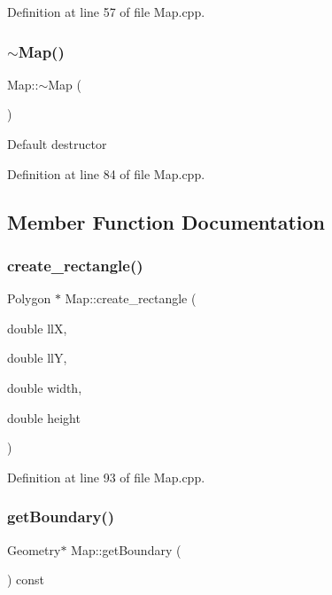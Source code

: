 Definition at line 57 of file Map.\+cpp.

\mbox{\label{class_map_aa403fbe09394ccf39747588f5168e3b2}} 
\subsubsection{$\sim$Map()}
{\footnotesize\ttfamily Map\+::$\sim$\+Map (\begin{DoxyParamCaption}{ }\end{DoxyParamCaption})\hspace{0.3cm}{\ttfamily [virtual]}}

Default destructor 

Definition at line 84 of file Map.\+cpp.



\subsection{Member Function Documentation}
\mbox{\label{class_map_a222f5585368eeb768b63b612207b6965}} 
\subsubsection{create\_rectangle()}
{\footnotesize\ttfamily Polygon $\ast$ Map\+::create\+\_\+rectangle (\begin{DoxyParamCaption}\item[{double}]{llX,  }\item[{double}]{llY,  }\item[{double}]{width,  }\item[{double}]{height }\end{DoxyParamCaption})\hspace{0.3cm}{\ttfamily [private]}}



Definition at line 93 of file Map.\+cpp.

\mbox{\label{class_map_a74dd5445ed90bea2a9cc3240bc23f1bc}} 
\subsubsection{getBoundary()}
{\footnotesize\ttfamily Geometry$\ast$ Map\+::get\+Boundary (\begin{DoxyParamCaption}{ }\end{DoxyParamCaption}) const\hspace{0.3cm}{\ttfamily [inline]}}



